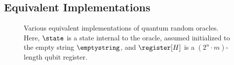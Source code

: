   \subsection{Equivalent Implementations}
    \begin{figure}[t]
      \centering
      \begin{pchstack}[center]

        \pchspace

        
        \pchspace

      \end{pchstack}
    \caption{
      \label{fig:qros}
      Various equivalent implementations of quantum random oracles.
      Here, $\state$ is a state internal to the oracle, assumed 
      initialized to the empty string $\emptystring$, and $\register[H]$ is a
      $(2^n \cdot m)$-length qubit register.
    }
    \end{figure}

